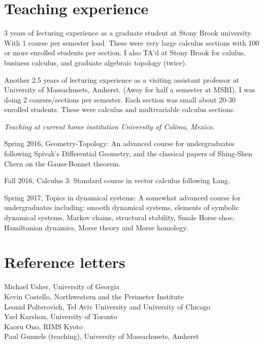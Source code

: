 \documentclass[overlapped,line,letterpaper]{res}
\begin{document}
\begin{resume}
 \section {\sc Teaching experience}
3 years of lecturing experience as a graduate student at Stony
Brook university. With 1 course per semester load. These were
very large calculus sections with 100 or more enrolled students
per section.  I also TA'd at Stony Brook for calulus, business
calculus, and graduate algebraic topology (twice). 


Another 2.5 years of lecturing experience as a visiting
assistant professor at University of Massachusets, Amherst.  (Away for half a
semester at MSRI).
I was doing 2 courses/sections per semester. Each section was
small about 20-30 enrolled students. 
These were calculus and multivariable calculus sections.


\emph{Teaching at current home institution University of Colima, Mexico.}

Spring 2016, Geometry-Topology: An advanced course for undergraduates following
Spivak's Differential Geometry, and the classical papers of Shing-Shen Chern on
the Gauss-Bonnet theorem.

Fall 2016, Calculus 3: Standard course in vector calculus following Lang.

Spring 2017, Topics in dynamical systems: A somewhat advanced course for
undergraduates including: smooth dynamical systems, elements of
symbolic dynamical systems, Markov chains, structural stability, Smale Horse
shoe, Hamiltonian dynamics, Morse theory
and Morse homology.
  \section {\sc Reference letters}
Michael Usher, University of Georgia \\
Kevin Costello, Northwestern and the Perimeter Institute \\ 
Leonid Polterovich, Tel Aviv University and University of Chicago \\
Yael Karshon, University of Toronto \\
Kaoru Ono, RIMS Kyoto \\
Paul Gunnels (teaching), University of Massachusets, Amherst \\
 \end{resume}
 
\end{document}
